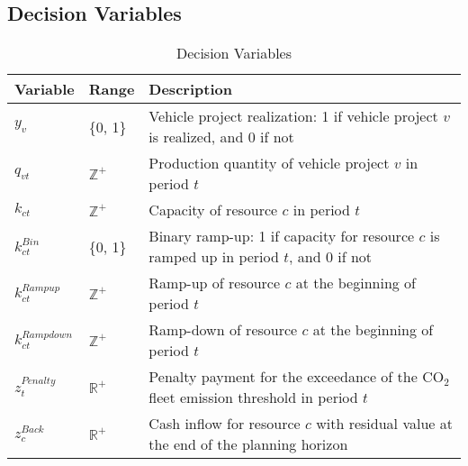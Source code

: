 \subsection{Decision Variables}\label{subsec: decision variables}
\begin{table}[h]
\centering
\begin{tabular}{llp{10cm}}
\toprule
Variable & Range & Description \\
\midrule
$y_v$ & \{0, 1\} & Vehicle project realization: 1 if vehicle project $v$ is realized, and 0 if not\\[1em]
$q_{vt}$ & $\mathbb Z^+$ & Production quantity of vehicle project $v$ in period $t$\\[1em]
$k_{ct}$ & $\mathbb Z^+$ & Capacity of resource $c$ in period $t$\\[1em]
$k_{ct}^{Bin}$ & \{0, 1\} & Binary ramp-up: 1 if capacity for resource $c$ is ramped up in period $t$, and 0 if not\\[1em]
$k_{ct}^{Rampup}$ &  $\mathbb Z^+$  & Ramp-up of resource $c$ at the beginning of period $t$\\[1em]
$k_{ct}^{Rampdown}$ &  $\mathbb Z^+$  & Ramp-down of resource $c$ at the beginning of period $t$\\[1em]
$z_{t}^{Penalty}$ & $\mathbb R^+$ & Penalty payment for the exceedance of the $\text{CO}_2$ fleet emission threshold in period $t$\\[1em]
$z_{c}^{Back}$ & $\mathbb R^+$ & Cash inflow for resource $c$ with residual value at the end of the planning horizon\\[1em]
\bottomrule
\end{tabular}
\caption{Decision Variables}\label{tab:decision variables}
\end{table}


